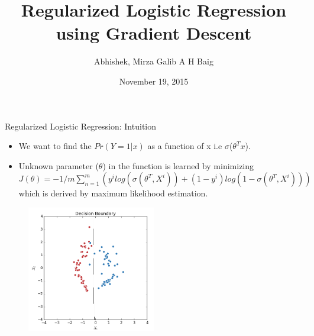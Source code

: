 \documentclass{beamer}
\title[Regularized Logistic Regression using Gradient Descent]{Regularized Logistic Regression using Gradient Descent}
\author{Abhishek, Mirza Galib A H Baig}
\institute{Indian Institute of Technology Guwahati}
\date{November 19, 2015}
\begin{document}
\begin{frame}
\titlepage
\end{frame}

\begin{frame}{Regularized Logistic Regression: Intuition}
\begin{itemize}
	\item We want to find the  $Pr(Y=1|x)$ as a function of x i.e $\sigma$($\theta^{T}x$). 
	\item Unknown parameter ($\theta$) in the function is learned by minimizing  $J(\theta)  =-1/m\sum_{n=1}^{m}(y^{i}log(\sigma(\theta^{T},X^{i})) + (1-y^{i})log(1-\sigma(\theta^{T},X^{i})))$ \\
	which is derived by  maximum likelihood estimation.
\end{itemize}

	\begin{figure}
		
		\includegraphics*[width=0.5\textwidth]{images/decision_boundary.png}
\end{figure}					
\end{frame}
\end{document}
